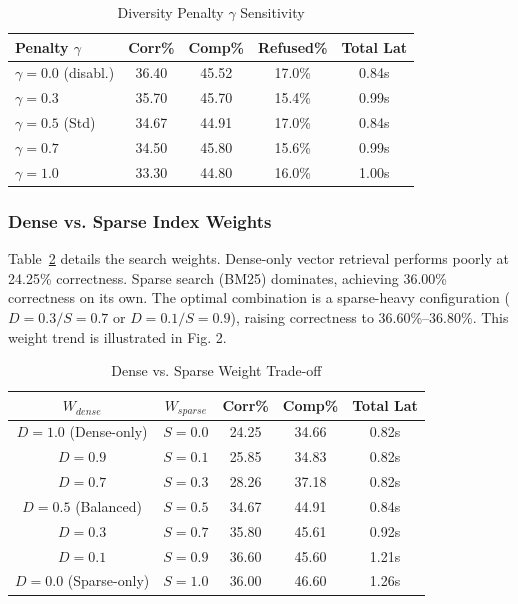 \documentclass[conference]{IEEEtran}
\begin{document}
\begin{table}[htbp]
\caption{Diversity Penalty $\gamma$ Sensitivity}
\label{tab:gamma}
\begin{center}
\footnotesize
\setlength{\tabcolsep}{4pt}
\begin{tabular}{lcccc}
\toprule
\textbf{Penalty $\gamma$} & \textbf{Corr\%} & \textbf{Comp\%} & \textbf{Refused\%} & \textbf{Total Lat} \\
\midrule
$\gamma=0.0$ (disabl.) & 36.40 & 45.52 & 17.0\% & 0.84s \\
$\gamma=0.3$ & 35.70 & 45.70 & 15.4\% & 0.99s \\
$\gamma=0.5$ (Std) & 34.67 & 44.91 & 17.0\% & 0.84s \\
$\gamma=0.7$ & 34.50 & 45.80 & 15.6\% & 0.99s \\
$\gamma=1.0$ & 33.30 & 44.80 & 16.0\% & 1.00s \\
\bottomrule
\end{tabular}
\end{center}
\end{table}

\subsubsection{Dense vs. Sparse Index Weights}
Table~\ref{tab:dense_sparse} details the search weights. Dense-only vector retrieval performs poorly at 24.25\% correctness. Sparse search (BM25) dominates, achieving 36.00\% correctness on its own. The optimal combination is a sparse-heavy configuration ($D=0.3/S=0.7$ or $D=0.1/S=0.9$), raising correctness to 36.60\%--36.80\%. This weight trend is illustrated in Fig. 2.

\begin{table}[htbp]
\caption{Dense vs. Sparse Weight Trade-off}
\label{tab:dense_sparse}
\begin{center}
\footnotesize
\setlength{\tabcolsep}{3pt}
\begin{tabular}{ccccc}
\toprule
\textbf{$W_{dense}$} & \textbf{$W_{sparse}$} & \textbf{Corr\%} & \textbf{Comp\%} & \textbf{Total Lat} \\
\midrule
$D=1.0$ (Dense-only) & $S=0.0$ & 24.25 & 34.66 & 0.82s \\
$D=0.9$ & $S=0.1$ & 25.85 & 34.83 & 0.82s \\
$D=0.7$ & $S=0.3$ & 28.26 & 37.18 & 0.82s \\
$D=0.5$ (Balanced) & $S=0.5$ & 34.67 & 44.91 & 0.84s \\
$D=0.3$ & $S=0.7$ & 35.80 & 45.61 & 0.92s \\
$D=0.1$ & $S=0.9$ & 36.60 & 45.60 & 1.21s \\
$D=0.0$ (Sparse-only) & $S=1.0$ & 36.00 & 46.60 & 1.26s \\
\bottomrule
\end{tabular}
\end{center}
\end{table}
\end{document}
